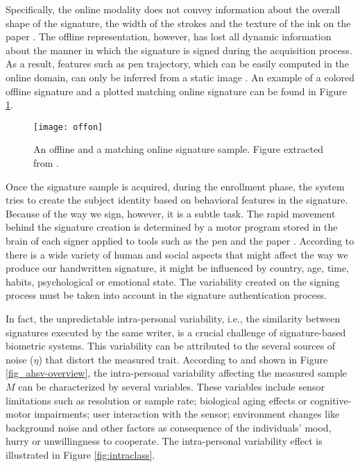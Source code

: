 Specifically, the online modality does not convey information about the overall shape of the signature, the width of the strokes and the texture of the ink on the paper \cite{diaz2014generation}. The offline representation, however, has lost all dynamic information about the manner in which the signature is signed during the acquisition process. As a result, features such as pen trajectory, which can be easily computed in the online domain, can only be inferred from a static image \cite{nel2005estimating}. An example of a colored offline signature and a plotted matching online signature can be found in Figure \ref{fig:offon}. 

\begin{figure}[!htb]
\centering
\texttt{[image: offon]}
\caption{An offline and a matching online signature sample. Figure extracted from \cite{sigcomp2009}.}
\label{fig:offon}
\end{figure}

Once the signature sample is acquired, during the enrollment phase, the system tries to create the subject identity based on behavioral features in the signature. Because of the way we sign, however, it is a subtle task. The rapid movement behind the signature creation is determined by a motor program stored in the brain of each signer applied to tools such as the pen and the paper \cite{pirlo2014advances}. According to \cite{plamondon1989automatic} there is a wide variety of human and social aspects that might affect the way we produce our handwritten signature, it might be influenced by country, age, time, habits, psychological or emotional state. The variability created on the signing process must be taken into account in the signature authentication process.

In fact, the unpredictable intra-personal variability, i.e., the similarity between signatures executed by the same writer, is a crucial challenge of signature-based biometric systems. This variability can be attributed to the several sources of noise ($\eta$) that distort the measured trait. According to \cite{jain2016} and shown in Figure \ref{fig_ahsv-overview}, the intra-personal variability affecting the measured sample {\boldm $M$} can be characterized by several variables. These variables include sensor limitations such as resolution or sample rate; biological aging effects or cognitive-motor impairments; user interaction with the sensor; environment changes like background noise and other factors as consequence of the individuals’ mood, hurry or unwillingness to cooperate. The intra-personal variability effect is illustrated in Figure \ref{fig:intraclass}.

